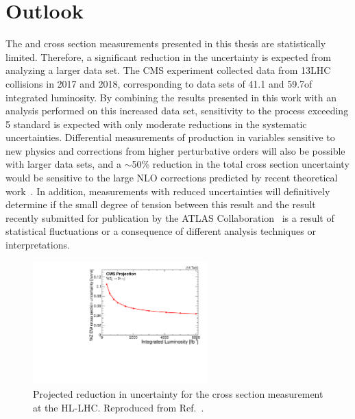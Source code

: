 \section{Outlook}

The \WZjj and \EWWZ cross section measurements 
presented in this thesis are statistically limited.
Therefore, a significant reduction in the uncertainty is expected from
analyzing a larger data set. The CMS experiment collected data from
13\TeV LHC collisions in 2017 and 2018, corresponding to data sets
of 41.1 and 59.7\fbinv of integrated luminosity.
By combining the results presented in this work with
an analysis performed on this increased data set, sensitivity to the \EWWZ process
exceeding 5 standard is expected with only moderate
reductions in the systematic uncertainties. Differential measurements
of \WZjj production in variables sensitive to new physics and corrections from higher 
perturbative orders will also be possible with larger data sets, and a
$\sim$50\% reduction in the total cross section uncertainty would be sensitive
to the large NLO \EW corrections predicted by recent theoretical work~\cite{Denner:2019tmn}.
In addition, measurements with reduced uncertainties will definitively determine 
if the small degree of tension between this result and the result
recently submitted for publication by the ATLAS 
Collaboration~\cite{Aaboud:2018ddq} is a result
of statistical fluctuations or a consequence of different analysis
techniques or interpretations.

\begin{figure}[htbp]
  \centering
   \includegraphics[width=0.6\textwidth]{figures/Conclusions/WZjjSignficanceHLLHC.pdf}
  \caption[Projected reduction in uncertainty for the \EWWZ cross section measurement at the HL-LHC]{
    Projected reduction in uncertainty for the \EWWZ cross section measurement 
    at the HL-LHC. Reproduced from Ref.~\cite{CMS-PAS-FTR-18-038}.
        }
 \label{fig:WZHLLHC}
\end{figure}

